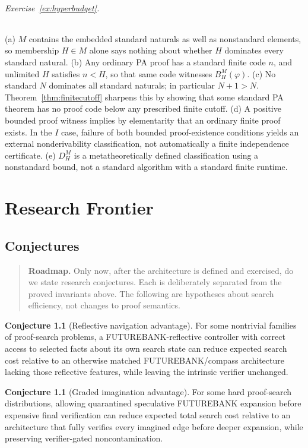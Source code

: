 \documentclass[11pt,openany]{book}
\theoremstyle{definition}
\newtheorem{conjecture}[theorem]{Conjecture}
\theoremstyle{remark}
\newenvironment{roadmap}{\begin{quote}\small\color{deepblue}\textbf{Roadmap.} }{\end{quote}}
\begin{document}
\paragraph{Exercise~\ref{ex:hyperbudget}.}
(a) $M$ contains the embedded standard naturals as well as nonstandard elements, so membership $H\in M$ alone says nothing about whether $H$ dominates every standard natural. (b) Any ordinary PA proof has a standard finite code $n$, and unlimited $H$ satisfies $n<H$, so that same code witnesses $B_H^M(\varphi)$. (c) No standard $N$ dominates all standard naturals; in particular $N+1>N$. Theorem~\ref{thm:finitecutoff} sharpens this by showing that some standard PA theorem has no proof code below any prescribed finite cutoff. (d) A positive bounded proof witness implies by elementarity that an ordinary finite proof exists. In the $I$ case, failure of both bounded proof-existence conditions yields an external nonderivability classification, not automatically a finite independence certificate. (e) $D_H^M$ is a metatheoretically defined classification using a nonstandard bound, not a standard algorithm with a standard finite runtime.

\part{Research Frontier}

\chapter{Conjectures}
\begin{roadmap}
Only now, after the architecture is defined and exercised, do we state research conjectures. Each is deliberately separated from the proved invariants above. The following are hypotheses about search efficiency, not changes to proof semantics.
\end{roadmap}

\begin{conjecture}[Reflective navigation advantage]\label{conj:reflect}
For some nontrivial families of proof-search problems, a FUTUREBANK-reflective controller with correct access to selected facts about its own search state can reduce expected search cost relative to an otherwise matched FUTUREBANK/compass architecture lacking those reflective features, while leaving the intrinsic verifier unchanged.
\end{conjecture}

\begin{conjecture}[Graded imagination advantage]\label{conj:graded}
For some hard proof-search distributions, allowing quarantined speculative FUTUREBANK expansion before expensive final verification can reduce expected total search cost relative to an architecture that fully verifies every imagined edge before deeper expansion, while preserving verifier-gated noncontamination.
\end{conjecture}
\end{document}

